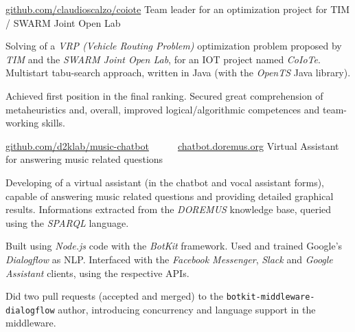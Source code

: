 



\begin{cventries}

	\cvproj
		{\href{https://github.com/claudioscalzo/coiote}{github.com/claudioscalzo/coiote}}
		{Team leader for an optimization project for TIM / SWARM Joint Open Lab}
		{}
		{}
		{
			\begin{cvitems} %
				\item {Solving of a \textit{VRP (Vehicle Routing Problem)} optimization problem proposed by \textit{TIM} and the \textit{SWARM Joint Open Lab}, for an IOT project named \textit{CoIoTe}. Multistart tabu-search approach, written in Java (with the \textit{OpenTS} Java library).}
				\item {Achieved first position in the final ranking. Secured great comprehension of metaheuristics and, overall, improved logical/algorithmic competences and team-working skills.}
			\end{cvitems}
		}

	\cvproj
		{\href{https://github.com/D2KLab/music-chatbot}{github.com/d2klab/music-chatbot}~~~\textbullet~~~\href{https://chatbot.doremus.org}{chatbot.doremus.org}}
		{Virtual Assistant for answering music related questions}
		{}
		{}
		{
			\begin{cvitems} %
				\item {Developing of a virtual assistant (in the chatbot and vocal assistant forms), capable of answering music related questions and providing detailed graphical results. Informations extracted from the \textit{DOREMUS} knowledge base, queried using the \textit{SPARQL} language.}
				\item {Built using \textit{Node.js} code with the \textit{BotKit} framework. Used and trained Google's \textit{Dialogflow} as NLP. Interfaced with the \textit{Facebook Messenger}, \textit{Slack} and \textit{Google Assistant} clients, using the respective APIs.}
				\item {Did two pull requests (accepted and merged) to the \texttt{botkit-middleware-dialogflow} author, introducing concurrency and language support in the middleware.}
			\end{cvitems}
		}
	

\end{cventries}
